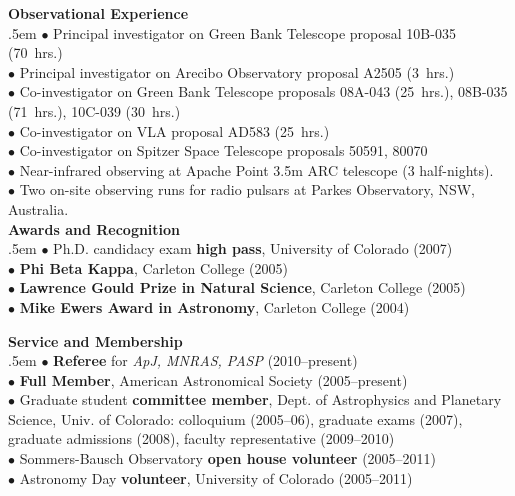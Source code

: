 {{{{\Large\bf Observational Experience}\\
\medskip
\parindent .5em
$\bullet$ Principal investigator on Green Bank Telescope proposal 10B-035 (70~hrs.) \\[2pt] %
$\bullet$ Principal investigator on Arecibo Observatory proposal A2505 (3~hrs.) \\[2pt]
$\bullet$ Co-investigator on Green Bank Telescope proposals 08A-043 (25~hrs.), 08B-035 (71~hrs.), 10C-039 (30~hrs.)\\[2pt]
$\bullet$ Co-investigator on VLA proposal AD583 (25~hrs.) \\[2pt]
$\bullet$ Co-investigator on Spitzer Space Telescope proposals 50591, 80070 \\[2pt]
$\bullet$ Near-infrared observing at Apache Point 3.5m ARC telescope (3 half-nights). \\[2pt]
$\bullet$ Two on-site observing runs for radio pulsars at Parkes Observatory, NSW, Australia. \\[2pt]

\medskip
\medskip
\noindent
{\Large\bf Awards and Recognition}\\[4pt]
\medskip
\parindent .5em
$\bullet$ Ph.D. candidacy exam {\bf high pass}, University of Colorado (2007)\\[2pt]
$\bullet$ {\bf Phi Beta Kappa}, Carleton College (2005)\\[2pt]
$\bullet$ {\bf Lawrence Gould Prize in Natural Science}, Carleton College (2005)\\[2pt]
$\bullet$ {\bf Mike Ewers Award in Astronomy}, Carleton College (2004)\\[2pt]

\parindent0in
\medskip

\medskip
\noindent
{\Large\bf Service and Membership}\\[4pt]
\medskip
\parindent .5em
$\bullet$ {\bf Referee} for {\it ApJ, MNRAS, PASP} (2010--present)\\[2pt]
$\bullet$ {\bf Full Member}, American Astronomical Society (2005--present)\\[2pt]
$\bullet$ Graduate student {\bf committee member}, Dept. of Astrophysics and Planetary Science, Univ. of Colorado: colloquium (2005--06), graduate exams (2007), graduate admissions (2008), faculty representative (2009--2010)\\[2pt]
$\bullet$ Sommers-Bausch Observatory {\bf open house volunteer} (2005--2011)\\[2pt]
$\bullet$ Astronomy Day {\bf volunteer}, University of Colorado (2005--2011)\\[2pt]

}}}
